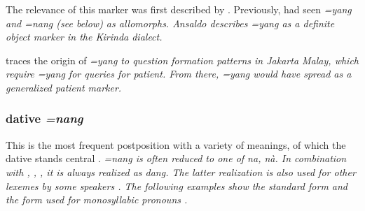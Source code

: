 The relevance of this marker was first described by \citet{Ansaldo2005ms}. Previously, \citet{SmithRH} had seen \em =yang \em and \em =nang \em (see below) as allomorphs.  Ansaldo describes \em =yang \em  as a definite object marker in the Kirinda dialect.


\citet[149]{Slomanson2006cll} traces the origin of \em =yang \em to question formation patterns in Jakarta Malay, which require \em =yang \em for queries for patient. From there, \em =yang \em would have spread as a generalized patient marker.

% 

% 
% 

 
 

% 

% 




\subsubsection{dative \em=nang\em}\label{sec:morph:=nang}
This is the most frequent postposition with a variety of meanings, of which the dative stands central
\citep{Ansaldo2005ms,%
Ansaldo2008genesis, %
Ansaldo2009book,
Slomanson2006cll,%
Slomanson2008lingua}.
\em =nang \em is often reduced to one of \em na, nà\em.  In combination with , , ,  it is always realized as \em dang\em. The latter realization is also used for other lexemes by some speakers \citep[cf.][66]{Saldin2001}. The following examples show the standard form  and the form used for monosyllabic pronouns .


